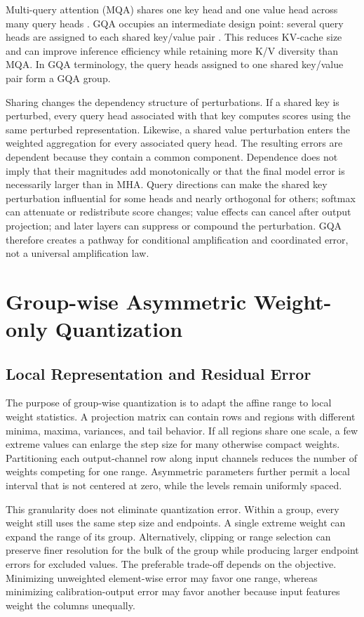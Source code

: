 Multi-query attention (MQA) shares one key head and one value head across many query heads \cite{shazeer2019fast}. GQA occupies an intermediate design point: several query heads are assigned to each shared key/value pair \cite{ainslie2023gqa}. This reduces KV-cache size and can improve inference efficiency while retaining more K/V diversity than MQA. In GQA terminology, the query heads assigned to one shared key/value pair form a GQA group.

Sharing changes the dependency structure of perturbations. If a shared key is perturbed, every query head associated with that key computes scores using the same perturbed representation. Likewise, a shared value perturbation enters the weighted aggregation for every associated query head. The resulting errors are dependent because they contain a common component. Dependence does not imply that their magnitudes add monotonically or that the final model error is necessarily larger than in MHA. Query directions can make the shared key perturbation influential for some heads and nearly orthogonal for others; softmax can attenuate or redistribute score changes; value effects can cancel after output projection; and later layers can suppress or compound the perturbation. GQA therefore creates a pathway for conditional amplification and coordinated error, not a universal amplification law.

\section{Group-wise Asymmetric Weight-only Quantization}

\subsection{Local Representation and Residual Error}

The purpose of group-wise quantization is to adapt the affine range to local weight statistics. A projection matrix can contain rows and regions with different minima, maxima, variances, and tail behavior. If all regions share one scale, a few extreme values can enlarge the step size for many otherwise compact weights. Partitioning each output-channel row along input channels reduces the number of weights competing for one range. Asymmetric parameters further permit a local interval that is not centered at zero, while the levels remain uniformly spaced.

This granularity does not eliminate quantization error. Within a group, every weight still uses the same step size and endpoints. A single extreme weight can expand the range of its group. Alternatively, clipping or range selection can preserve finer resolution for the bulk of the group while producing larger endpoint errors for excluded values. The preferable trade-off depends on the objective. Minimizing unweighted element-wise error may favor one range, whereas minimizing calibration-output error may favor another because input features weight the columns unequally.

